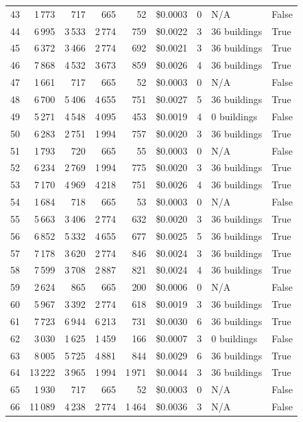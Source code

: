 \documentclass[a4paper,11pt]{article}
\begin{document}
\begin{table}[ht]
\begin{tabular}{r r r r r r r p{3cm} l}
43 & 1\,773 & 717 & 665 & 52 & \$0.0003 & 0 & N/A & False \\
44 & 6\,995 & 3\,533 & 2\,774 & 759 & \$0.0022 & 3 & 36 buildings & True \\
45 & 6\,372 & 3\,466 & 2\,774 & 692 & \$0.0021 & 3 & 36 buildings & True \\
46 & 7\,868 & 4\,532 & 3\,673 & 859 & \$0.0026 & 4 & 36 buildings & True \\
47 & 1\,661 & 717 & 665 & 52 & \$0.0003 & 0 & N/A & False \\
48 & 6\,700 & 5\,406 & 4\,655 & 751 & \$0.0027 & 5 & 36 buildings & True \\
49 & 5\,271 & 4\,548 & 4\,095 & 453 & \$0.0019 & 4 & 0 buildings & False \\
50 & 6\,283 & 2\,751 & 1\,994 & 757 & \$0.0020 & 3 & 36 buildings & True \\
51 & 1\,793 & 720 & 665 & 55 & \$0.0003 & 0 & N/A & False \\
52 & 6\,234 & 2\,769 & 1\,994 & 775 & \$0.0020 & 3 & 36 buildings & True \\
53 & 7\,170 & 4\,969 & 4\,218 & 751 & \$0.0026 & 4 & 36 buildings & True \\
54 & 1\,684 & 718 & 665 & 53 & \$0.0003 & 0 & N/A & False \\
55 & 5\,663 & 3\,406 & 2\,774 & 632 & \$0.0020 & 3 & 36 buildings & True \\
56 & 6\,852 & 5\,332 & 4\,655 & 677 & \$0.0025 & 5 & 36 buildings & True \\
57 & 7\,178 & 3\,620 & 2\,774 & 846 & \$0.0024 & 3 & 36 buildings & True \\
58 & 7\,599 & 3\,708 & 2\,887 & 821 & \$0.0024 & 4 & 36 buildings & True \\
59 & 2\,624 & 865 & 665 & 200 & \$0.0006 & 0 & N/A & False \\
60 & 5\,967 & 3\,392 & 2\,774 & 618 & \$0.0019 & 3 & 36 buildings & True \\
61 & 7\,723 & 6\,944 & 6\,213 & 731 & \$0.0030 & 6 & 36 buildings & True \\
62 & 3\,030 & 1\,625 & 1\,459 & 166 & \$0.0007 & 3 & 0 buildings & False \\
63 & 8\,005 & 5\,725 & 4\,881 & 844 & \$0.0029 & 6 & 36 buildings & True \\
64 & 13\,222 & 3\,965 & 1\,994 & 1\,971 & \$0.0044 & 3 & 36 buildings & True \\
65 & 1\,930 & 717 & 665 & 52 & \$0.0003 & 0 & N/A & False \\
66 & 11\,089 & 4\,238 & 2\,774 & 1\,464 & \$0.0036 & 3 & N/A & False \\

\end{tabular}
\end{table}
\end{document}
